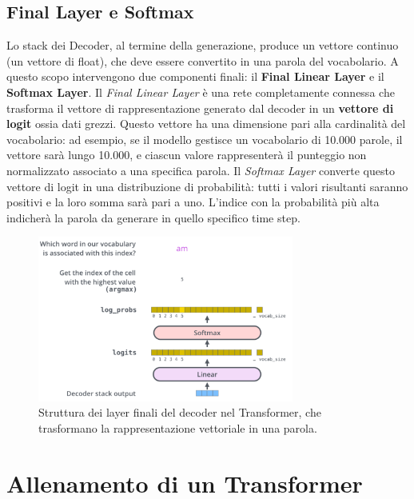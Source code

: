 \subsection{Final Layer e Softmax}

Lo stack dei Decoder, al termine della generazione, produce un vettore continuo (un vettore di float), che deve essere convertito in una parola del vocabolario. A questo scopo intervengono due componenti finali: il \textbf{Final Linear Layer} e il \textbf{Softmax Layer}. Il \textit{Final Linear Layer} è una rete completamente connessa che trasforma il vettore di rappresentazione generato dal decoder in un \textbf{vettore di logit} ossia dati grezzi. Questo vettore ha una dimensione pari alla cardinalità del vocabolario: ad esempio, se il modello gestisce un vocabolario di 10.000 parole, il vettore sarà lungo 10.000, e ciascun valore rappresenterà il punteggio non normalizzato associato a una specifica parola. Il \textit{Softmax Layer} converte questo vettore di logit in una distribuzione di probabilità: tutti i valori risultanti saranno positivi e la loro somma sarà pari a uno. L’indice con la probabilità più alta indicherà la parola da generare in quello specifico time step.

\begin{figure}
    \centering
    \includegraphics[width=0.75\textwidth]{figure/FinalLayer.png}
    \caption{Struttura dei layer finali del decoder nel Transformer, che trasformano la rappresentazione vettoriale in una parola.}
    \label{fig:FinLay}
\end{figure}

\section{Allenamento di un Transformer}


